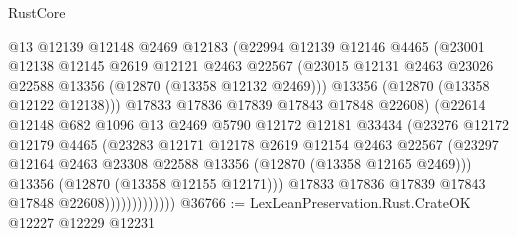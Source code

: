 \begin{lexlean}{RustCore}
\begin{coremodule}
                          @13
                          @12139
                          @12148
                          @2469
                          @12183
                          (@22994
                            @12139
                            @12146
                            @4465
                            (@23001
                              @12138
                              @12145
                              @2619
                              @12121
                              @2463
                              @22567
                              (@23015
                                @12131
                                @2463
                                @23026
                                @22588
                                @13356
                                (@12870 (@13358 @12132 @2469)))
                              @13356
                              (@12870 (@13358 @12122 @12138)))
                            @17833
                            @17836
                            @17839
                            @17843
                            @17848
                            @22608)
                          (@22614
                            @12148
                            @682
                            @1096
                            @13
                            @2469
                            @5790
                            @12172
                            @12181
                            @33434
                            (@23276
                              @12172
                              @12179
                              @4465
                              (@23283
                                @12171
                                @12178
                                @2619
                                @12154
                                @2463
                                @22567
                                (@23297
                                  @12164
                                  @2463
                                  @23308
                                  @22588
                                  @13356
                                  (@12870 (@13358 @12165 @2469)))
                                @13356
                                (@12870 (@13358 @12155 @12171)))
                              @17833
                              @17836
                              @17839
                              @17843
                              @17848
                              @22608)))))))))))))
@36766 := LexLeanPreservation.Rust.CrateOK @12227 @12229 @12231

\end{coremodule}
\end{lexlean}
